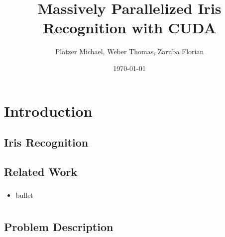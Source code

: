 \documentclass{beamer}
\begin{document}
\title[Massively Parallelized Iris Recognition with CUDA]{Massively Parallelized Iris Recognition with CUDA}
\author[Platzer M., Weber T., Zaruba F.]{Platzer Michael, Weber Thomas, Zaruba Florian}
\date{\today}

\begin{frame}
\titlepage
\end{frame}


\section{Introduction} 
\subsection{Iris Recognition}
\begin{frame}
\frametitle{} 

\end{frame}

\subsection{Related Work}
\begin{frame}
\frametitle{} 

  \begin{itemize}
    \item bullet
  \end{itemize} 
\end{frame}

\section{} 
\subsection{Problem Description}
\begin{frame}

\end{frame}
  
\end{document}
